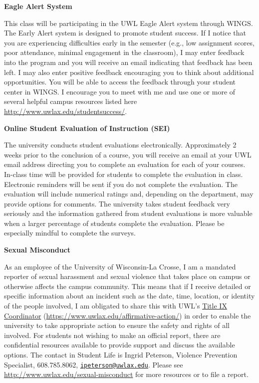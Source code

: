 \documentclass[10pt]{article}
\newcommand{\bulurl}[1]{\url{#1}}
\newcommand{\toprule}{\par\vspace*{5pt}\noindent{\hrule\hfill}\par\vspace*{1pt}}
\newcommand{\botrule}{\par\noindent{\hrule\hfill}\par}
\begin{document}
\botrule \textbf{Eagle Alert System} \toprule 
This class will be participating in the UWL Eagle Alert system through WINGS. The Early Alert system is designed to promote student success. If I notice that you are experiencing difficulties early in the semester (e.g., low assignment scores, poor attendance, minimal engagement in the classroom), I may enter feedback into the program and you will receive an email indicating that feedback has been left.  I may also enter positive feedback encouraging you to think about additional opportunities. You will be able to access the feedback through your student center in WINGS.  I encourage you to meet with me and use one or more of several helpful campus resources listed here \bulurl{http://www.uwlax.edu/studentsuccess/}. \\

\botrule \textbf{Online Student Evaluation of Instruction (SEI)} \toprule
The university conducts student evaluations electronically. Approximately 2 weeks prior to the conclusion of a course, you will receive an email at your UWL email address directing you to complete an evaluation for each of your courses. In-class time will be provided for students to complete the evaluation in class. Electronic reminders will be sent if you do not complete the evaluation. The evaluation will include numerical ratings and, depending on the department, may provide options for comments. The university takes student feedback very seriously and the information gathered from student evaluations is more valuable when a larger percentage of students complete the evaluation. Please be especially mindful to complete the surveys.\\

\botrule \textbf{Sexual Misconduct} \toprule
As an employee of the University of Wisconsin-La Crosse, I am a mandated reporter of sexual harassment and sexual violence that takes place on campus or otherwise affects the campus community. This means that if I receive detailed or specific information about an incident such as the date, time, location, or identity of the people involved, I am obligated to share this with UWL's \href{https://www.uwlax.edu/affirmative-action/}{Title IX Coordinator} (\bulurl{https://www.uwlax.edu/affirmative-action/}) in order to enable the university to take appropriate action to ensure the safety and rights of all involved. For students not wishing to make an official report, there are confidential resources available to provide support and discuss the available options. The contact in Student Life is Ingrid Peterson, Violence Prevention Specialist, 608.785.8062, \texttt{\href{mailto:ipeterson@uwlax.edu}{ipeterson@uwlax.edu}}. Please see \bulurl{http://www.uwlax.edu/sexual-misconduct} for more resources or to file a report.\\
\end{document}
